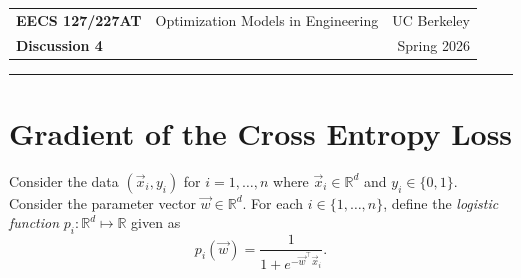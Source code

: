 \documentclass[10pt]{article}
\newcommand{\RR}{\mathbb{R}}
\begin{document}
\begin{center}
\begin{tabular}{lcr}
\textbf{EECS 127/227AT} & Optimization Models in Engineering & UC Berkeley \\
\textbf{Discussion 4} & & Spring 2026
\end{tabular}
\end{center}

\noindent\rule{\textwidth}{0.4pt}

\section{Gradient of the Cross Entropy Loss}

Consider the data $(\vec{x}_i, y_i)$ for $i = 1, \ldots, n$ where $\vec{x}_i \in \RR^d$ and $y_i \in \{0, 1\}$. Consider the parameter vector $\vec{w} \in \RR^d$. For each $i \in \{1, \ldots, n\}$, define the \emph{logistic function} $p_i \colon \RR^d \mapsto \RR$ given as
\begin{equation}
p_i(\vec{w}) = \frac{1}{1 + e^{-\vec{w}^\top \vec{x}_i}}.
\end{equation}
\end{document}
